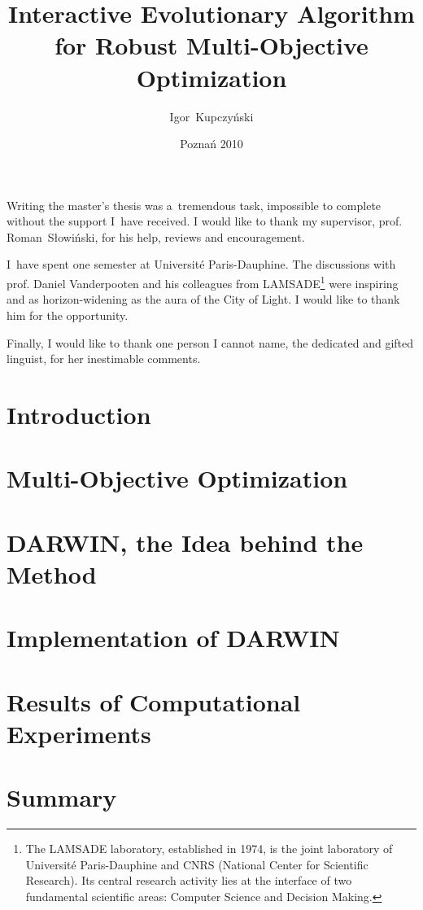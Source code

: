 \documentclass[a4paper,english,thesis]{dcsbook}
\author{Igor~Kupczy\'nski}
\date{Pozna\'n 2010}
\title{Interactive Evolutionary Algorithm \\ for Robust Multi-Objective
  Optimization}
\begin{document}
\maketitle
\frontmatter

\parbox{1cm}{
\vspace{15cm}
}

Writing the master's thesis was a~tremendous task, impossible to complete
without the support I~have received. I would like to thank my supervisor,
prof. Roman~S\l{}owi\'nski, for his help, reviews and encouragement.

I~have spent one semester at Universit\'{e} Paris-Dauphine. The discussions
with prof. Daniel Vanderpooten and his colleagues from LAMSADE\footnote{The
  LAMSADE laboratory, established in 1974, is the joint laboratory of
  Universit\'{e} Paris-Dauphine and CNRS (National Center for Scientific
  Research). Its central research activity lies at the interface of two
  fundamental scientific areas: Computer Science and Decision Making.} were
inspiring and as horizon-widening as the aura of the City of Light. I would
like to thank him for the opportunity.

Finally, I would like to thank one person I cannot name, the dedicated and
gifted linguist, for her inestimable comments.

\tableofcontents{}
\mainmatter

\chapter{Introduction}

\chapter{Multi-Objective Optimization}


\chapter{DARWIN, the Idea behind the Method}
\label{darwin-the-idea}

\chapter{Implementation of DARWIN}
\label{darwin-implementation}


\chapter{Results of Computational Experiments}
\label{exp-results}


\chapter{Summary}


\backmatter 


\appendix
\appendixpage
\addappheadtotoc

\end{document}
